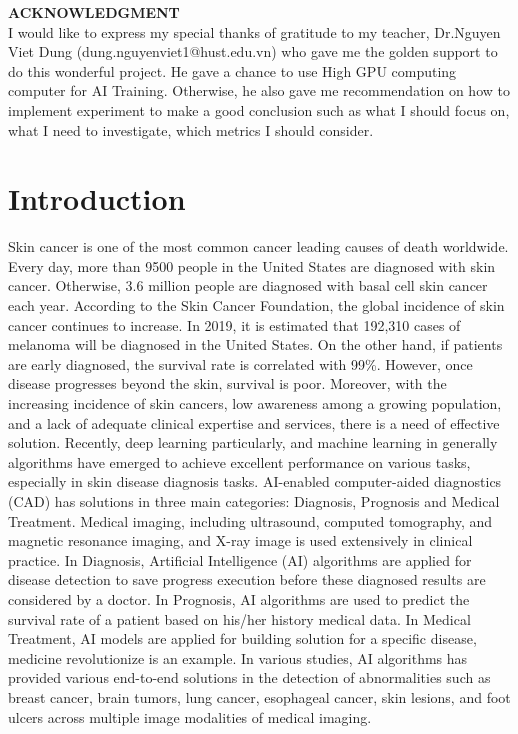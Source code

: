 \textbf{ACKNOWLEDGMENT} \\ 
I would like to express my special thanks of gratitude to my teacher, Dr.Nguyen Viet Dung (dung.nguyenviet1@hust.edu.vn) who gave me the golden support to do this wonderful project. He gave a chance to use High GPU computing computer for AI Training. Otherwise, he also gave me recommendation on how to implement experiment to make a good conclusion such as what I should focus on, what I need to investigate, which metrics I should consider.  
\section{Introduction}
Skin cancer is one of the most common cancer leading causes of death worldwide. Every day, more than 9500\cite{03358} people in the United States are diagnosed with skin cancer. Otherwise, 3.6\cite{03358} million people are diagnosed with basal cell skin cancer each year. According to the Skin Cancer Foundation, the global incidence of skin cancer continues to increase\cite{11872}. In 2019, it is estimated that 192,310 cases of melanoma will be diagnosed in the United States\cite{11872}. On the other hand, if patients are early diagnosed, the survival rate is correlated with 99\%. However, once disease progresses beyond the skin, survival is poor\cite{11872}. Moreover, with the increasing
incidence of skin cancers, low awareness among a growing population, and a lack of adequate clinical expertise and services, there is a need of effective solution. \newline
Recently, deep learning particularly, and machine learning in generally algorithms have emerged to achieve excellent performance on various tasks, especially in skin disease diagnosis tasks. AI-enabled computer-aided diagnostics (CAD) has solutions in three main categories: Diagnosis, Prognosis and Medical Treatment. Medical imaging, including ultrasound, computed tomography, and magnetic resonance imaging, and X-ray image is used extensively in clinical practice. In Diagnosis, Artificial Intelligence (AI) algorithms are applied for disease detection to save progress execution before these diagnosed results are considered by a doctor. In Prognosis, AI algorithms are used to predict the survival rate of a patient based on his/her history medical data. In Medical Treatment, AI models are applied for building solution for a specific disease, medicine revolutionize is an example. In various studies, AI algorithms has provided various end-to-end solutions in the detection of abnormalities such as breast cancer, brain tumors, lung cancer, esophageal cancer, skin lesions, and foot ulcers across multiple image modalities of medical imaging\cite{11872}. \\
